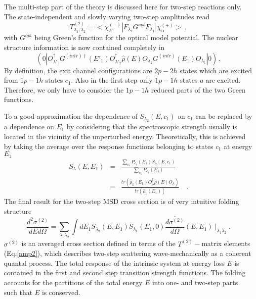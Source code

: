 \documentclass[twocolumn,amsmath,amssymb,10pt,groupedaddress,a4paper]{revtex4}
\begin{document}
The multi-step part of the theory is discussed here for two-step reactions
only. The state-independent and slowly varying two-step amplitudes
read
\begin{equation}
T_{\lambda_{1},\lambda_{2}}^{(2)}=<\chi_{E}^{(-)}|F_{\lambda_{2}}G^{opt}F_{\lambda_{1}}|\chi_{\alpha}^{(+)}>\,,\label{amp2}
\end{equation}
\noindent with $G^{opt}$ being Green's function for the optical model potential.
The nuclear structure information is now contained completely in
\begin{equation}
(0|O_{\lambda'_{1}}^{\dag}G^{(intr)\dag}(E'_{1})O_{\lambda'_{2}}^{\dag}\hat{\rho}(E)O_{\lambda_{2}}G^{(intr)}(E_{1})O_{\lambda_{1}}|0)\,.\label{two1}
\end{equation}
\noindent By definition, the exit channel configurations are $2p-2h$ states
which are excited from $1p-1h$ states $c_{1}$. Also in the first
step only $1p-1h$ states $a$ are excited. Therefore, we only have
to consider the $1p-1h$ reduced parts of the two Green functions.

To a good approximation the dependence of $S_{\lambda_{2}}(E,c_{1})$
on $c_{1}$ can be replaced by a dependence on $E_{1}$ by considering
that the spectroscopic strength usually is located in the vicinity
of the unperturbed energy. Theoretically, this is achieved by taking
the average over the response functions belonging to states $c_{1}$
at energy $E_{1}$
\begin{eqnarray}
S_{\lambda}(E,E_{1}) & = & \frac{\sum_{c_{1}}{P_{c_{1}}(E_{1})S_{\lambda}(E,c_{1})}}{\sum_{c_{1}}{P_{c_{1}}(E_{1})}}\nonumber \\
 & = & \frac{tr(\hat{\rho}_{1}(E_{1})O_{\lambda}^{\dag}\hat{\rho}(E)O_{\lambda})}{tr(\hat{\rho}_{1}(E_{1}))}\quad.\label{slave}
 \end{eqnarray}
\noindent The final result for the two-step MSD cross section is
of very intuitive folding structure
\begin{equation}
\frac{d^{2}\sigma^{(2)}}{dEd\Omega}=\sum_{\lambda_{1}\lambda_{2}}{\int dE_{1}S_{\lambda_{2}}(E,E_{1})S_{\lambda_{1}}(E_{1},0)\overline{\frac{d\sigma^{(2)}}{d\Omega}}(E,E_{1})\mid_{\lambda_{1}\lambda_{2}}}.
\label{sigma2}
\end{equation}
\noindent $\overline{\sigma^{(2)}}$ is an averaged cross section defined in
terms of the $T^{(2)}-$matrix elements (Eq.\ref{amp2}), which describes
two-step scattering wave-mechanically as a coherent quantal process.
The total response of the intrinsic system at energy loss $E$ is
contained in the first and second step transition strength functions.
The folding accounts for the partitions of the total energy $E$ into
one- and two-step parts such that $E$ is conserved.
\end{document}
